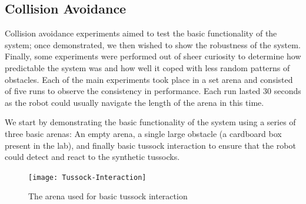 \documentclass[a4paper,12pt,twoside,openright]{article}
\begin{document}
\subsection{Collision Avoidance}
Collision avoidance experiments aimed to test the basic functionality of the system; once demonstrated, we then wished to show
the robustness of the system. Finally, some experiments were performed out of sheer curiosity to determine how predictable the
system was and how well it coped with less random patterns of obstacles.
Each of the main experiments took place in a set arena and consisted of five runs to observe the consistency in performance.
Each run lasted 30 seconds as the robot could usually navigate the length of the arena in this time.
\newline

We start by demonstrating the basic functionality of the system using a series of three basic arenas: An empty arena, a single large obstacle
(a cardboard box present in the lab), and finally basic tussock interaction to ensure that the robot could detect and react to the synthetic
tussocks.

\begin{figure}[h]
  \centering
  \texttt{[image: Tussock-Interaction]}
  \caption{
    \label{fig:tussock-interaction} The arena used for basic tussock interaction
  }
\end{figure}
\end{document}
